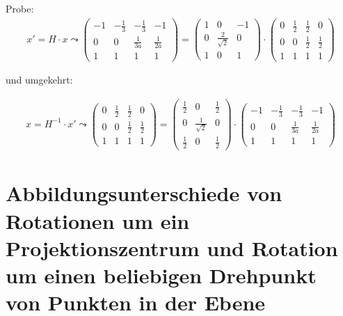 Probe:
\begin{gather}
x'=H \cdot x \leadsto 
	\begin{pmatrix}
	-1&-\frac{1}{3}&-\frac{1}{3}&-1\\
	0&0&\frac{1}{3a}&\frac{1}{2a}\\
	1&1&1&1
\end{pmatrix}= 	\begin{pmatrix}
1&0&-1\\
0&\frac{2}{\sqrt{2}}&0\\
1&0&1
\end{pmatrix}
\cdot
		\begin{pmatrix}
0&\frac{1}{2}&\frac{1}{2}&0\\
0&0&\frac{1}{2}&\frac{1}{2}\\
1&1&1&1
\end{pmatrix}
\end{gather}

und umgekehrt:

\begin{gather}
x=H^{-1} \cdot x' \leadsto 
\begin{pmatrix}
0&\frac{1}{2}&\frac{1}{2}&0\\
0&0&\frac{1}{2}&\frac{1}{2}\\
1&1&1&1
\end{pmatrix}
= 	\begin{pmatrix}
\frac{1}{2}&0&\frac{1}{2}\\
0&\frac{1}{\sqrt{2}}&0\\
\frac{1}{2}&0&\frac{1}{2}
\end{pmatrix}
\cdot
\begin{pmatrix}
-1&-\frac{1}{3}&-\frac{1}{3}&-1\\
0&0&\frac{1}{3a}&\frac{1}{2a}\\
1&1&1&1
\end{pmatrix}
\end{gather}

\section{Abbildungsunterschiede von Rotationen um ein Projektionszentrum und Rotation um einen beliebigen Drehpunkt von Punkten in der Ebene}

